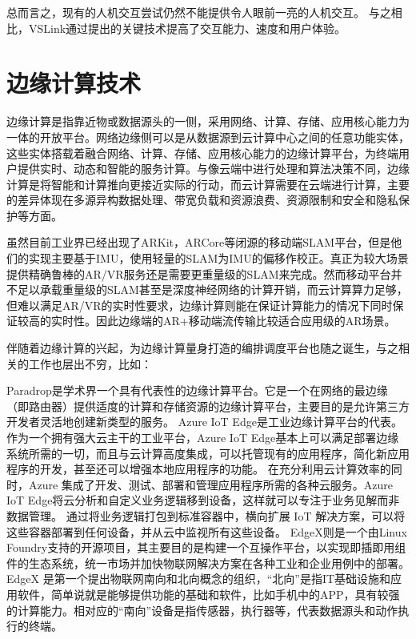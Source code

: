 总而言之，现有的人机交互尝试仍然不能提供令人眼前一亮的人机交互。
与之相比，VSLink通过提出的关键技术提高了交互能力、速度和用户体验。

\section{边缘计算技术}
边缘计算是指靠近物或数据源头的一侧，采用网络、计算、存储、应用核心能力为一体的开放平台。网络边缘侧可以是从数据源到云计算中心之间的任意功能实体，这些实体搭载着融合网络、计算、存储、应用核心能力的边缘计算平台，为终端用户提供实时、动态和智能的服务计算。与像云端中进行处理和算法决策不同，边缘计算是将智能和计算推向更接近实际的行动，而云计算需要在云端进行计算，主要的差异体现在多源异构数据处理、带宽负载和资源浪费、资源限制和安全和隐私保护等方面。

虽然目前工业界已经出现了ARKit，ARCore等闭源的移动端SLAM平台，但是他们的实现主要基于IMU，使用轻量的SLAM为IMU的偏移作校正。真正为较大场景提供精确鲁棒的AR/VR服务还是需要更重量级的SLAM来完成。然而移动平台并不足以承载重量级的SLAM甚至是深度神经网络的计算开销，而云计算算力足够，但难以满足AR/VR的实时性要求，边缘计算则能在保证计算能力的情况下同时保证较高的实时性。因此边缘端的AR+移动端流传输比较适合应用级的AR场景。

伴随着边缘计算的兴起，为边缘计算量身打造的编排调度平台也随之诞生，与之相关的工作也层出不穷，比如：

Paradrop\cite{WilDasBan14,WilDasBan142,LiuWilBan16,Ban18}是学术界一个具有代表性的边缘计算平台。它是一个在网络的最边缘（即路由器）提供适度的计算和存储资源的边缘计算平台，主要目的是允许第三方开发者灵活地创建新类型的服务。
Azure IoT Edge\cite{AzureIoTEdge}是工业边缘计算平台的代表。作为一个拥有强大云主干的工业平台，Azure IoT Edge基本上可以满足部署边缘系统所需的一切，而且与云计算高度集成，可以托管现有的应用程序，简化新应用程序的开发，甚至还可以增强本地应用程序的功能。 在充分利用云计算效率的同时，Azure 集成了开发、测试、部署和管理应用程序所需的各种云服务。Azure IoT Edge将云分析和自定义业务逻辑移到设备，这样就可以专注于业务见解而非数据管理。 通过将业务逻辑打包到标准容器中，横向扩展 IoT 解决方案，可以将这些容器部署到任何设备，并从云中监视所有这些设备。
EdgeX\cite{EdgeXFoundry}则是一个由Linux Foundry支持的开源项目，其主要目的是构建一个互操作平台，以实现即插即用组件的生态系统，统一市场并加快物联网解决方案在各种工业和企业用例中的部署。EdgeX 是第一个提出物联网南向和北向概念的组织，“北向”是指IT基础设施和应用软件，简单说就是能够提供功能的基础和软件，比如手机中的APP，具有较强的计算能力。相对应的“南向”设备是指传感器，执行器等，代表数据源头和动作执行的终端。

